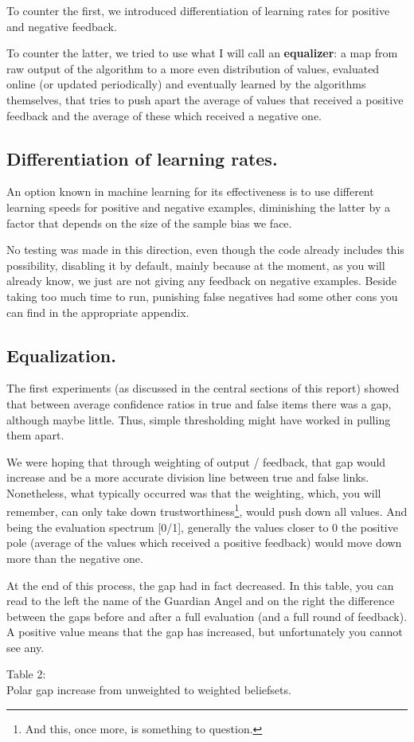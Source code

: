 \documentclass[11pt]{article}
\begin{document}
To counter the first, we introduced differentiation of learning rates for positive and negative feedback.

To counter the latter, we tried to use what I will call an \textbf{equalizer}: a map from raw output of the algorithm to a more even distribution of values, evaluated online (or updated periodically) and eventually learned by the algorithms themselves, that tries to push apart the average of values that received a positive feedback and the average of these which received a negative one.

\subsection{Differentiation of learning rates.}
An option known in machine learning for its effectiveness is to use different learning speeds for positive and negative examples, diminishing the latter by a factor that depends on the size of the sample bias we face.

No testing was made in this direction, even though the code already includes this possibility, disabling it by default, mainly because at the moment, as you will already know, we just are not giving any feedback on negative examples. Beside taking too much time to run, punishing false negatives had some other cons you can find in the appropriate appendix.

\subsection{Equalization.}
The first experiments (as discussed in the central sections of this report) showed that between average confidence ratios in true and false items there was a gap, although maybe little. Thus, simple thresholding might have worked in pulling them apart.

We were hoping that through weighting of output / feedback, that gap would increase and be a more accurate division line between true and false links. Nonetheless, what typically occurred was that the weighting, which, you will remember, can only take down trustworthiness\footnote{And this, once more, is something to question.}, would push down all values. And being the evaluation spectrum [0/1], generally the values closer to 0 the positive pole (average of the values which received a positive feedback) would move down more than the negative one.

At the end of this process, the gap had in fact decreased. In this table, you can read to the left the name of the Guardian Angel and on the right the difference between the gaps before and after a full evaluation (and a full round of feedback). A positive value means that the gap has increased, but unfortunately you cannot see any. 
\clearpage
\begin{center}Table 2:\\
Polar gap increase from unweighted to weighted beliefsets.\end{center}
\end{document}

